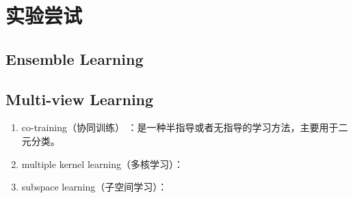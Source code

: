 \section{实验尝试}
%
\subsection{Ensemble Learning}

\subsection{Multi-view Learning}
\begin{enumerate}
\item co-training（协同训练） ：是一种半指导或者无指导的学习方法，主要用于二元分类。
\item multiple kernel learning（多核学习）：
\item subspace learning（子空间学习）：
\end{enumerate}

